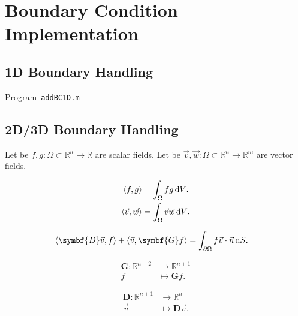 \section{Boundary Condition Implementation}

\subsection{1D Boundary Handling}

\begin{octavelisting}
	\tiny
	\centering
	\caption{Program~\texttt{addBC1D.m}}
	\label{code:addBC1D.m}
\end{octavelisting}

\subsection{2D/3D Boundary Handling}

Let be
\begin{math}
	f,g\colon\Omega\subset\mathbb{R}^{n}\to
	\mathbb{R}
\end{math}
are scalar fields.
Let be
\begin{math}
	\vec{v},\vec{w}\colon\Omega\subset\mathbb{R}^{n}\to
	\mathbb{R}^{m}
\end{math}
are vector fields.

\begin{align*}
	\left\langle
	f,g
	\right\rangle & =
	\int_{\Omega}fg \dl V. \\
	\left\langle
	\vec{v},\vec{w}
	\right\rangle & =
	\int_{\Omega}\vec{v}\vec{w}\dl V.
\end{align*}

\begin{align*}
	\left\langle
	\symbf{D}\vec{v},
	f
	\right\rangle+
	\left\langle
	\vec{v},
	\symbf{G}f
	\right\rangle & =
	\int_{\partial\Omega}
	f\vec{v}\cdot\vec{n}\dl S.
\end{align*}

\begin{align*}
	\symbf{G}\colon\mathbb{R}^{n+2} & \longrightarrow
	\mathbb{R}^{n+1}                                  \\
	f                               & \longmapsto
	\symbf{G}f.
\end{align*}

\begin{align*}
	\symbf{D}\colon\mathbb{R}^{n+1} & \longrightarrow
	\mathbb{R}^{n}                                    \\
	\vec{v}                         & \longmapsto
	\symbf{D}\vec{v}.
\end{align*}

